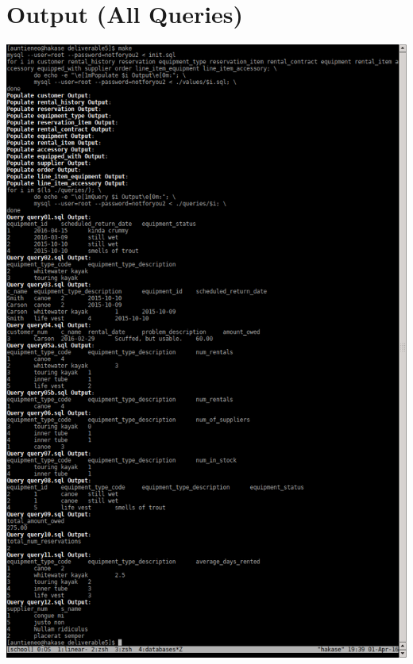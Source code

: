 \documentclass[12pt]{article}
\begin{document}
\section{Output (All Queries)}
\includegraphics[scale=0.45]{./screenshots/deliverable4output.png}
\end{document}
